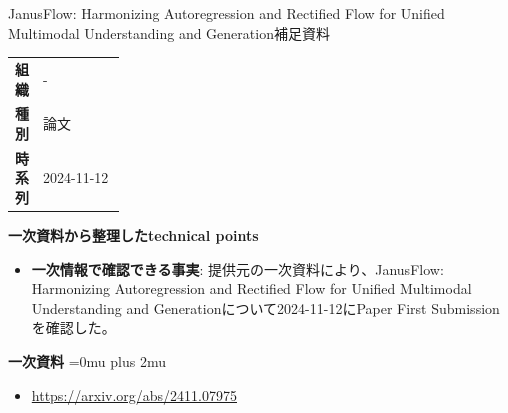 \begin{technicalnote}{JanusFlow: Harmonizing Autoregression and Rectified Flow for Unified Multimodal Understanding and Generation}{補足資料}
\begingroup
\begin{tabularx}{\linewidth}{@{}>{\bfseries}p{0.22\linewidth}X@{}}
組織 & - \\
種別 & 論文 \\
時系列 & 2024-11-12 \\
\end{tabularx}
\smallskip
{\bfseries 一次資料から整理したtechnical points}
\begin{itemize}[leftmargin=1.5em,itemsep=0.35em]
\item \textbf{一次情報で確認できる事実}: 提供元の一次資料により、JanusFlow: Harmonizing Autoregression and Rectified Flow for Unified Multimodal Understanding and Generationについて2024-11-12にPaper First Submissionを確認した。
\end{itemize}
\begin{minipage}{\linewidth}
\begin{samepage}
{\bfseries 一次資料}
\begingroup\sloppy
\Urlmuskip=0mu plus 2mu\relax
\begin{itemize}[leftmargin=1.5em,itemsep=0.25em]
\item {\scriptsize\url{https://arxiv.org/abs/2411.07975}}
\end{itemize}
\endgroup
\end{samepage}
\end{minipage}
\endgroup
\end{technicalnote}
\medskip

